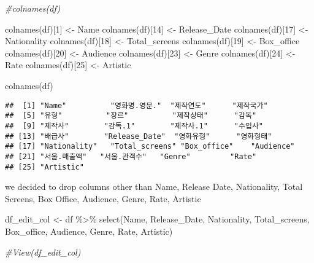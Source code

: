 \documentclass[
]{article}
\newenvironment{Shaded}{\begin{snugshade}}{\end{snugshade}}
\newcommand{\CommentTok}[1]{\textcolor[rgb]{0.56,0.35,0.01}{\textit{#1}}}
\newcommand{\DecValTok}[1]{\textcolor[rgb]{0.00,0.00,0.81}{#1}}
\newcommand{\FunctionTok}[1]{\textcolor[rgb]{0.00,0.00,0.00}{#1}}
\newcommand{\NormalTok}[1]{#1}
\newcommand{\OtherTok}[1]{\textcolor[rgb]{0.56,0.35,0.01}{#1}}
\newcommand{\SpecialCharTok}[1]{\textcolor[rgb]{0.00,0.00,0.00}{#1}}
\newcommand{\StringTok}[1]{\textcolor[rgb]{0.31,0.60,0.02}{#1}}
\begin{document}
\begin{Shaded}
\begin{Highlighting}[]
\CommentTok{\#colnames(df)}

\FunctionTok{colnames}\NormalTok{(df)[}\DecValTok{1}\NormalTok{] }\OtherTok{\textless{}{-}} \StringTok{\textquotesingle{}Name\textquotesingle{}}
\FunctionTok{colnames}\NormalTok{(df)[}\DecValTok{14}\NormalTok{] }\OtherTok{\textless{}{-}} \StringTok{\textquotesingle{}Release\_Date\textquotesingle{}}
\FunctionTok{colnames}\NormalTok{(df)[}\DecValTok{17}\NormalTok{] }\OtherTok{\textless{}{-}} \StringTok{\textquotesingle{}Nationality\textquotesingle{}}
\FunctionTok{colnames}\NormalTok{(df)[}\DecValTok{18}\NormalTok{] }\OtherTok{\textless{}{-}} \StringTok{\textquotesingle{}Total\_screens\textquotesingle{}}
\FunctionTok{colnames}\NormalTok{(df)[}\DecValTok{19}\NormalTok{] }\OtherTok{\textless{}{-}} \StringTok{\textquotesingle{}Box\_office\textquotesingle{}}
\FunctionTok{colnames}\NormalTok{(df)[}\DecValTok{20}\NormalTok{] }\OtherTok{\textless{}{-}} \StringTok{\textquotesingle{}Audience\textquotesingle{}}
\FunctionTok{colnames}\NormalTok{(df)[}\DecValTok{23}\NormalTok{] }\OtherTok{\textless{}{-}} \StringTok{\textquotesingle{}Genre\textquotesingle{}}
\FunctionTok{colnames}\NormalTok{(df)[}\DecValTok{24}\NormalTok{] }\OtherTok{\textless{}{-}} \StringTok{\textquotesingle{}Rate\textquotesingle{}}
\FunctionTok{colnames}\NormalTok{(df)[}\DecValTok{25}\NormalTok{] }\OtherTok{\textless{}{-}} \StringTok{\textquotesingle{}Artistic\textquotesingle{}}

\FunctionTok{colnames}\NormalTok{(df)}
\end{Highlighting}
\end{Shaded}

\begin{verbatim}
##  [1] "Name"          "영화명.영문."  "제작연도"      "제작국가"     
##  [5] "유형"          "장르"          "제작상태"      "감독"         
##  [9] "제작사"        "감독.1"        "제작사.1"      "수입사"       
## [13] "배급사"        "Release_Date"  "영화유형"      "영화형태"     
## [17] "Nationality"   "Total_screens" "Box_office"    "Audience"     
## [21] "서울.매출액"   "서울.관객수"   "Genre"         "Rate"         
## [25] "Artistic"
\end{verbatim}

we decided to drop columns other than Name, Release Date, Nationality,
Total Screens, Box Office, Audience, Genre, Rate, Artistic

\begin{Shaded}
\begin{Highlighting}[]
\NormalTok{df\_edit\_col }\OtherTok{\textless{}{-}}\NormalTok{ df }\SpecialCharTok{\%\textgreater{}\%} \FunctionTok{select}\NormalTok{(Name, Release\_Date, Nationality, }
\NormalTok{                      Total\_screens, Box\_office, Audience,}
\NormalTok{                      Genre, Rate, Artistic)}

\CommentTok{\#View(df\_edit\_col)}
\end{Highlighting}
\end{Shaded}
\end{document}
